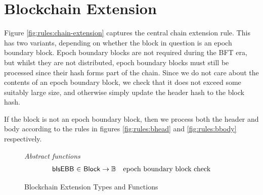 \documentclass[11pt,a4paper]{article}
\newcommand{\fun}[1]{\mathsf{#1}}
\newcommand{\type}[1]{\mathsf{#1}}
\newcommand{\totalf}{\to}
\newcommand{\Block}{\type{Block}}
\newcommand{\isebbname}{bIsEBB}
\begin{document}
\clearpage

\section{Blockchain Extension}
\label{sec:chain-extension}

\newcommand{\CEEnv}{\type{CEEnv}}
\newcommand{\CEState}{\type{CEState}}

Figure \ref{fig:rules:chain-extension} captures the central chain extension
rule. This has two variants, depending on whether the block in question is an
epoch boundary block. Epoch boundary blocks are not required during the BFT era,
but whilst they are not distributed, epoch boundary blocks must still be
processed since their hash forms part of the chain. Since we do not care about
the contents of an epoch boundary block, we check that it does not exceed some
suitably large size, and otherwise simply update the header hash to the block
hash.

If the block is not an epoch boundary block, then we process both the header and
body according to the rules in figures \ref{fig:rules:bhead} and
\ref{fig:rules:bbody} respectively.

\begin{figure}[ht]
  \emph{Abstract functions}
  \begin{equation*}
    \begin{array}{r@{~\in~}lr}
      \fun{\isebbname} & \Block \totalf \mathbb{B} & \text{epoch boundary block check} \\
    \end{array}
  \end{equation*}
  \caption{Blockchain Extension Types and Functions}
  \label{fig:defs:chain-extension}
\end{figure}
\end{document}
